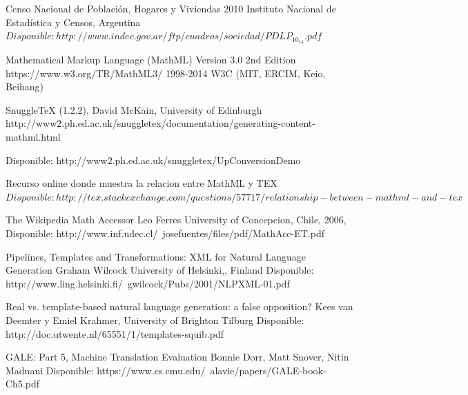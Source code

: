 \documentclass[
11pt, %
oneside, %
english, %
doublespacing, %
nolistspacing, %
parskip, %
parident,
headsepline, %
]{MastersDoctoralThesis} %
\begin{document}

%
%

\renewcommand{\bibname}{Referencias}

\begin{thebibliography}{99}

{\small

Censo Nacional de Población,
Hogares y Viviendas 2010
Instituto Nacional de Estadística y Censos, Argentina
$Disponible: http://www.indec.gov.ar/ftp/cuadros/sociedad/PDLP_10_14.pdf$

Mathematical Markup Language (MathML) Version 3.0 2nd Edition
https://www.w3.org/TR/MathML3/
1998-2014 W3C (MIT, ERCIM, Keio, Beihang)

SnuggleTeX (1.2.2), David McKain, University of Edinburgh
http://www2.ph.ed.ac.uk/snuggletex/documentation/generating-content-mathml.html

Disponible: http://www2.ph.ed.ac.uk/snuggletex/UpConversionDemo

Recurso online donde muestra la relacion entre MathML y TEX
$Disponible: http://tex.stackexchange.com/questions/57717/relationship-between-mathml-and-tex$

The Wikipedia Math Accessor
Leo Ferres
University of Concepcion, Chile, 2006, Disponible: http://www.inf.udec.cl/~josefuentes/files/pdf/MathAcc-ET.pdf

Pipelines, Templates and Transformations: XML for Natural Language Generation
Graham Wilcock
University of Helsinki,, Finland
Disponible: http://www.ling.helsinki.fi/~gwilcock/Pubs/2001/NLPXML-01.pdf

Real vs. template-based natural language generation: a false opposition?
Kees van Deemter y Emiel Krahmer,
University of Brighton Tilburg
Disponible: http://doc.utwente.nl/65551/1/templates-squib.pdf

GALE: Part 5,  Machine Translation Evaluation
Bonnie Dorr, Matt Snover, Nitin Madnani
Disponible: https://www.cs.cmu.edu/~alavie/papers/GALE-book-Ch5.pdf

}
\end{thebibliography}

\end{document}
